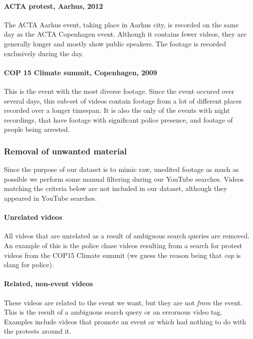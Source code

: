 \paragraph{ACTA protest, Aarhus, 2012}
%
The ACTA Aarhus event, taking place in Aarhus city, is recorded on the same day as the ACTA Copenhagen event. Although it contains fewer videos, they are generally longer and mostly show public speakers. The footage is recorded exclusively during the day.
%
\paragraph{COP 15 Climate summit, Copenhagen, 2009}
%
This is the event with the most diverse footage. Since the event occured over several days, this sub-set of videos contain footage from a lot of different places recorded over a longer timespan. It is also the only of the events with night recordings, that have footage with significant police presence, and footage of people being arrested.
%
\subsubsection{Removal of unwanted material}
%
Since the purpose of our dataset is to mimic raw, unedited footage as much as possible we perform some manual filtering during our YouTube searches. Videos matching the criteria below are not included in our dataset, although they appeared in YouTube searches.
%
\paragraph{Unrelated videos}
%
All videos that are unrelated as a result of ambiguous search queries are removed. An example of this is the police chase videos resulting from a search for protest videos from the COP15 Climate summit (we guess the reason being that \emph{cop} is slang for police).
%
\paragraph{Related, non-event videos}
%
These videos are related to the event we want, but they are not \emph{from} the event. This is the result of a ambiguous search query or an errornous video tag. Examples include videos that promote an event or which had nothing to do with the protests around it.
%
